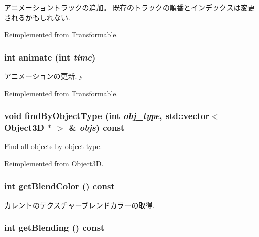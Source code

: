 アニメーショントラックの追加。 既存のトラックの順番とインデックスは変更されるかもしれない. 

Reimplemented from \hyperlink{classm3g_1_1Transformable_415c0b110f95410ded9b85e5d99a496b}{Transformable}.\hypertarget{classm3g_1_1Texture2D_82cfeb67ca66b93e2ca7bda9a4f0e2aa}{
\subsubsection[{animate}]{\setlength{\rightskip}{0pt plus 5cm}int animate (int {\em time})}}
\label{classm3g_1_1Texture2D_82cfeb67ca66b93e2ca7bda9a4f0e2aa}


アニメーションの更新. y 

Reimplemented from \hyperlink{classm3g_1_1Transformable_8aad1ceab4c2a03609c8a42324ce484d}{Transformable}.\hypertarget{classm3g_1_1Texture2D_4dadb21b568b0230fac106f15040138c}{
\subsubsection[{findByObjectType}]{\setlength{\rightskip}{0pt plus 5cm}void findByObjectType (int {\em obj\_\-type}, \/  std::vector$<$ {\bf Object3D} $\ast$ $>$ \& {\em objs}) const}}
\label{classm3g_1_1Texture2D_4dadb21b568b0230fac106f15040138c}


Find all objects by object type. 

Reimplemented from \hyperlink{classm3g_1_1Object3D_4dadb21b568b0230fac106f15040138c}{Object3D}.\hypertarget{classm3g_1_1Texture2D_b7dc7b7bf2934448281894f2c1ef3638}{
\subsubsection[{getBlendColor}]{\setlength{\rightskip}{0pt plus 5cm}int getBlendColor () const}}
\label{classm3g_1_1Texture2D_b7dc7b7bf2934448281894f2c1ef3638}


カレントのテクスチャーブレンドカラーの取得. \hypertarget{classm3g_1_1Texture2D_078954de3d786bd11dc98b06f237bbbb}{
\subsubsection[{getBlending}]{\setlength{\rightskip}{0pt plus 5cm}int getBlending () const}}
\label{classm3g_1_1Texture2D_078954de3d786bd11dc98b06f237bbbb}


